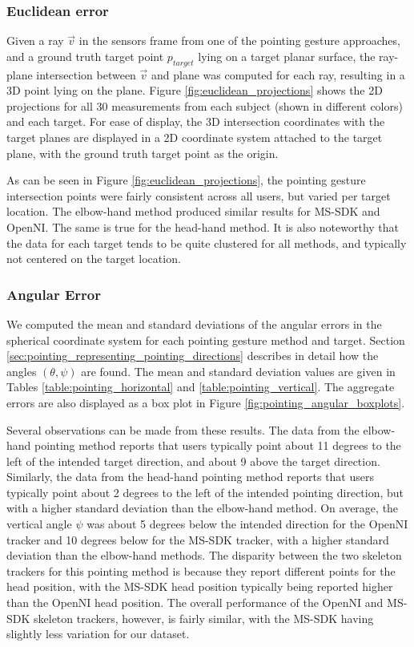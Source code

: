 \subsubsection{Euclidean error}
\label{sec:pointing_euclidean_error}

Given a ray $\vec{v}$ in the sensors frame from one of the pointing gesture approaches, and a ground truth target point $p_{target}$ lying on a target planar surface, the ray-plane intersection between $\vec{v}$ and plane was computed for each ray, resulting in a 3D point lying on the plane. Figure \ref{fig:euclidean_projections} shows the 2D projections for all 30 measurements from each subject (shown in different colors) and each target. For ease of display, the 3D intersection coordinates with the target planes are displayed in a 2D coordinate system attached to the target plane, with the ground truth target point as the origin.  

As can be seen in Figure \ref{fig:euclidean_projections},  the pointing gesture intersection points were fairly consistent across all users, but varied per target location.  The elbow-hand method produced similar results for MS-SDK and OpenNI. The same is true for the head-hand method.  It is also noteworthy that the data for each target tends to be quite clustered for all methods, and typically not centered on the target location.

\subsubsection{Angular Error}
\label{sec:pointing_angular_error}

We computed the mean and standard deviations of the angular errors in the spherical coordinate system for each pointing gesture method and target. Section \ref{sec:pointing_representing_pointing_directions} describes in detail how the angles $(\theta, \psi)$ are found. The mean and standard deviation values are given in Tables \ref{table:pointing_horizontal} and \ref{table:pointing_vertical}.  The aggregate errors are also displayed as a  box plot in Figure \ref{fig:pointing_angular_boxplots}.

Several observations can be made from these results. The data from the elbow-hand pointing method reports that users typically point about 11 degrees to the left of the intended target direction, and about 9 above the target direction. Similarly, the data from the head-hand pointing method reports that users typically point about 2 degrees to the left of the intended pointing direction, but with a higher standard deviation than the elbow-hand method.  On average, the vertical angle $\psi$ was about 5 degrees below the intended direction for the OpenNI tracker and 10 degrees below for the MS-SDK tracker, with a higher standard deviation than the elbow-hand methods.  The disparity between the two skeleton trackers for this pointing method is because they report different points for the head position, with the MS-SDK head position typically being reported higher than the OpenNI head position. The overall performance of the OpenNI and MS-SDK skeleton trackers, however, is fairly similar, with the MS-SDK having slightly less variation for our dataset.

